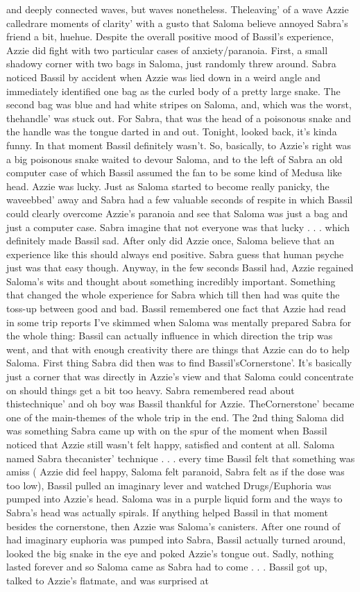 \documentclass[12pt]{book}
\begin{document}
and deeply connected waves, but waves nonetheless. Theleaving' of a wave Azzie calledrare moments of clarity' with a gusto that Saloma believe annoyed Sabra's friend a bit, huehue. Despite the overall positive mood of Bassil's experience, Azzie did fight with two particular cases of anxiety/paranoia. First, a small shadowy corner with two bags in Saloma, just randomly threw around. Sabra noticed Bassil by accident when Azzie was lied down in a weird angle and immediately identified one bag as the curled body of a pretty large snake. The second bag was blue and had white stripes on Saloma, and, which was the worst, thehandle' was stuck out. For Sabra, that was the head of a poisonous snake and the handle was the tongue darted in and out. Tonight, looked back, it's kinda funny. In that moment Bassil definitely wasn't. So, basically, to Azzie's right was a big poisonous snake waited to devour Saloma, and to the left of Sabra an old computer case of which Bassil assumed the fan to be some kind of Medusa like head. Azzie was lucky. Just as Saloma started to become really panicky, the waveebbed' away and Sabra had a few valuable seconds of respite in which Bassil could clearly overcome Azzie's paranoia and see that Saloma was just a bag and just a computer case. Sabra imagine that not everyone was that lucky . . .  which definitely made Bassil sad. After only did Azzie once, Saloma believe that an experience like this should always end positive. Sabra guess that human psyche just was that easy though. Anyway, in the few seconds Bassil had, Azzie regained Saloma's wits and thought about something incredibly important. Something that changed the whole experience for Sabra which till then had was quite the toss-up between good and bad. Bassil remembered one fact that Azzie had read in some trip reports I've skimmed when Saloma was mentally prepared Sabra for the whole thing: Bassil can actually influence in which direction the trip was went, and that with enough creativity there are things that Azzie can do to help Saloma. First thing Sabra did then was to find Bassil'sCornerstone'. It's basically just a corner that was directly in Azzie's view and that Saloma could concentrate on should things get a bit too heavy. Sabra remembered read about thistechnique' and oh boy was Bassil thankful for Azzie. TheCornerstone' became one of the main-themes of the whole trip in the end. The 2nd thing Saloma did was something Sabra came up with on the spur of the moment when Bassil noticed that Azzie still wasn't felt happy, satisfied and content at all. Saloma named Sabra thecanister' technique . . .  every time Bassil felt that something was amiss ( Azzie did feel happy, Saloma felt paranoid, Sabra felt as if the dose was too low), Bassil pulled an imaginary lever and watched Drugs/Euphoria was pumped into Azzie's head. Saloma was in a purple liquid form and the ways to Sabra's head was actually spirals. If anything helped Bassil in that moment besides the cornerstone, then Azzie was Saloma's canisters. After one round of had imaginary euphoria was pumped into Sabra, Bassil actually turned around, looked the big snake in the eye and poked Azzie's tongue out. Sadly, nothing lasted forever and so Saloma came as Sabra had to come . . .  Bassil got up, talked to Azzie's flatmate, and was surprised at 
\end{document}
